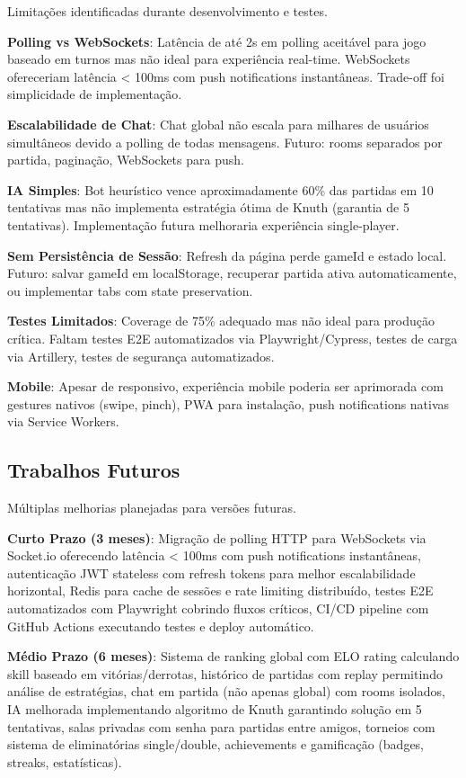 \documentclass[conference]{IEEEtran}
\begin{document}
Limitações identificadas durante desenvolvimento e testes.

\textbf{Polling vs WebSockets}: Latência de até 2s em polling aceitável para jogo baseado em turnos mas não ideal para experiência real-time. WebSockets ofereceriam latência < 100ms com push notifications instantâneas. Trade-off foi simplicidade de implementação.

\textbf{Escalabilidade de Chat}: Chat global não escala para milhares de usuários simultâneos devido a polling de todas mensagens. Futuro: rooms separados por partida, paginação, WebSockets para push.

\textbf{IA Simples}: Bot heurístico vence aproximadamente 60\% das partidas em 10 tentativas mas não implementa estratégia ótima de Knuth (garantia de 5 tentativas). Implementação futura melhoraria experiência single-player.

\textbf{Sem Persistência de Sessão}: Refresh da página perde gameId e estado local. Futuro: salvar gameId em localStorage, recuperar partida ativa automaticamente, ou implementar tabs com state preservation.

\textbf{Testes Limitados}: Coverage de 75\% adequado mas não ideal para produção crítica. Faltam testes E2E automatizados via Playwright/Cypress, testes de carga via Artillery, testes de segurança automatizados.

\textbf{Mobile}: Apesar de responsivo, experiência mobile poderia ser aprimorada com gestures nativos (swipe, pinch), PWA para instalação, push notifications nativas via Service Workers.

\subsection{Trabalhos Futuros}

Múltiplas melhorias planejadas para versões futuras.

\textbf{Curto Prazo (3 meses)}: Migração de polling HTTP para WebSockets via Socket.io oferecendo latência < 100ms com push notifications instantâneas, autenticação JWT stateless com refresh tokens para melhor escalabilidade horizontal, Redis para cache de sessões e rate limiting distribuído, testes E2E automatizados com Playwright cobrindo fluxos críticos, CI/CD pipeline com GitHub Actions executando testes e deploy automático.

\textbf{Médio Prazo (6 meses)}: Sistema de ranking global com ELO rating calculando skill baseado em vitórias/derrotas, histórico de partidas com replay permitindo análise de estratégias, chat em partida (não apenas global) com rooms isolados, IA melhorada implementando algoritmo de Knuth garantindo solução em 5 tentativas, salas privadas com senha para partidas entre amigos, torneios com sistema de eliminatórias single/double, achievements e gamificação (badges, streaks, estatísticas).
\end{document}

